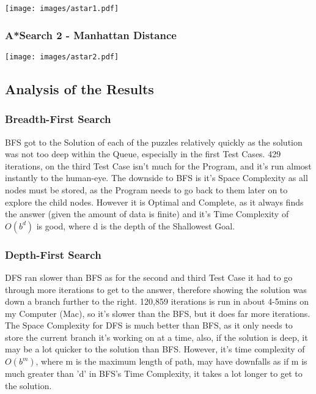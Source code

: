 \documentclass[11pt]{article} %
\begin{document}
					\texttt{[image: images/astar1.pdf]}
	
				\subsubsection{A*Search 2 - Manhattan Distance}
					\texttt{[image: images/astar2.pdf]}


			\subsection{Analysis of the Results}

				\subsubsection{Breadth-First Search}

					BFS got to the Solution of each of the puzzles relatively quickly as the solution was not too deep within the Queue, especially in the first Test Cases. 429 iterations, on the third Test Case isn't much for the Program, and it's run almost instantly to the human-eye. The downside to BFS is it's Space Complexity as all nodes must be stored, as the Program needs to go back to them later on to explore the child nodes. However it is Optimal and Complete, as it always finds the answer (given the amount of data is finite) and it's Time Complexity of \begin{math} O(b^d) \end{math} is good, where d is the depth of the Shallowest Goal.
	
				\subsubsection{Depth-First Search}

					DFS ran slower than BFS as for the second and third Test Case it had to go through more iterations to get to the answer, therefore showing the solution was down a branch further to the right. 120,859 iterations is run in about 4-5mins on my Computer (Mac), so it's slower than the BFS, but it does far more iterations. The Space Complexity for DFS is much better than BFS, as it only needs to store the current branch it's working on at a time, also, if the solution is deep, it may be a lot quicker to the solution than BFS. However, it's time complexity of  \begin{math} O(b^m) \end{math}, where m is the maximum length of path, may have downfalls as if m is much greater than 'd' in BFS's Time Complexity, it takes a lot longer to get to the solution.
	
\end{document}
